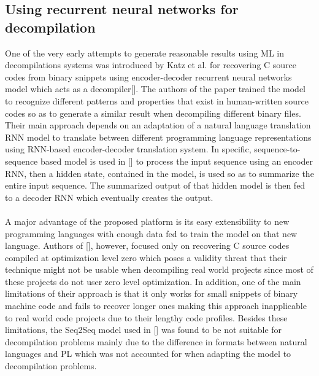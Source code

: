 \documentclass{article}
\begin{document}
\subsection{Using recurrent neural networks for decompilation}
\noindent One of the very early attempts to generate reasonable results using ML in decompilations systems was introduced by Katz et al. for recovering C source codes from binary snippets using encoder-decoder recurrent neural networks model which acts as a decompiler[].
The authors of the paper trained the model to recognize different patterns and properties that exist in human-written source codes so as to generate a similar result when decompiling different binary files.
Their main approach depends on an adaptation of a natural language translation RNN model to translate between different programming language representations using RNN-based encoder-decoder translation system.
In specific, sequence-to-sequence based model is used in [] to process the input sequence using an encoder RNN, then a hidden state, contained in the model, is used so as to summarize the entire input sequence.
The summarized output of that hidden model is then fed to a decoder RNN which eventually creates the output. \\\\
A major advantage of the proposed platform is its easy extensibility to new programming languages with enough data fed to train the model on that new language.
Authors of [], however, focused only on recovering C source codes compiled at optimization level zero which poses a validity threat that their technique might not be usable when decompiling real world projects since most of these projects do not user zero level optimization.
In addition, one of the main limitations of their approach is that it only works for small snippets of binary machine code and fails to recover longer ones making this approach inapplicable to real world code projects due to their lengthy code profiles.
Besides these limitations, the Seq2Seq model used in [] was found to be not suitable for decompilation problems mainly due to the difference in formats between natural languages and PL which was not accounted for when adapting the model to decompilation problems.\\\\
\end{document}
